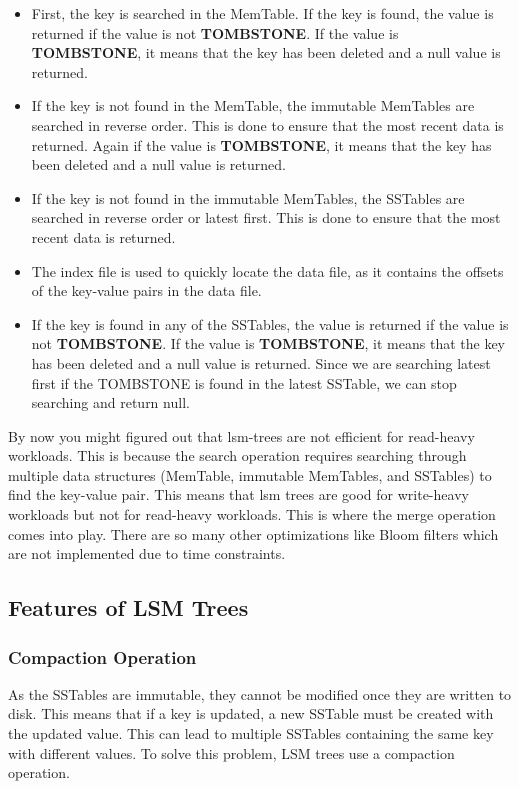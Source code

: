 \documentclass{article}
\begin{document}
\begin{itemize}
    \item First, the key is searched in the MemTable. If the key is found, the value is returned if the value is not \textbf{TOMBSTONE}. If the value is \textbf{TOMBSTONE}, it means that the key has been deleted and a null value is returned.
    \item If the key is not found in the MemTable, the immutable MemTables are searched in reverse order. This is done to ensure that the most recent data is returned. Again if the value is \textbf{TOMBSTONE}, it means that the key has been deleted and a null value is returned.
    \item If the key is not found in the immutable MemTables, the SSTables are searched in reverse order or latest first. This is done to ensure that the most recent data is returned.
    \item The index file is used to quickly locate the data file, as it contains the offsets of the key-value pairs in the data file.
    \item If the key is found in any of the SSTables, the value is returned if the value is not \textbf{TOMBSTONE}. If the value is \textbf{TOMBSTONE}, it means that the key has been deleted and a null value is returned. Since we are searching latest first if the TOMBSTONE is found in the latest SSTable, we can stop searching and return null.
\end{itemize}

\noindent By now you might figured out that lsm-trees are not efficient for read-heavy workloads. This is because the search operation requires searching through multiple data structures (MemTable, immutable MemTables, and SSTables) to find the key-value pair. This means that lsm trees are good for write-heavy workloads but not for read-heavy workloads. This is where the merge operation comes into play. There are so many other optimizations like Bloom filters which are not implemented due to time constraints.

\subsection{Features of LSM Trees}

\subsubsection{Compaction Operation}

\noindent As the SSTables are immutable, they cannot be modified once they are written to disk. This means that if a key is updated, a new SSTable must be created with the updated value. This can lead to multiple SSTables containing the same key with different values. To solve this problem, LSM trees use a compaction operation.
\end{document}
